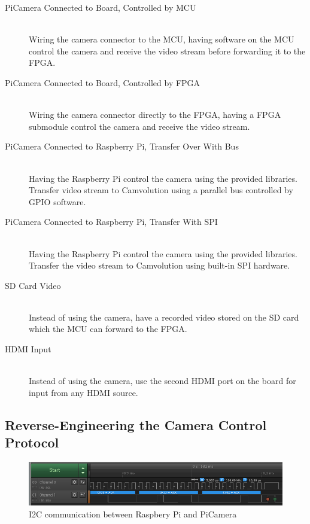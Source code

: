 \begin{description}
    \item[PiCamera Connected to Board, Controlled by MCU]
        \hfill\\
        Wiring the camera connector to the MCU, having software on the MCU control the camera and receive the video stream before forwarding it to the FPGA.
    \item[PiCamera Connected to Board, Controlled by FPGA]
        \hfill\\
        Wiring the camera connector directly to the FPGA, having a FPGA submodule control the camera and receive the video stream.
    \item[PiCamera Connected to Raspberry Pi, Transfer Over With Bus]
        \hfill\\
        Having the Raspberry Pi control the camera using the provided libraries.
        Transfer video stream to Camvolution using a parallel bus controlled by GPIO software.
    \item[PiCamera Connected to Raspberry Pi, Transfer With SPI]
        \hfill\\
        Having the Raspberry Pi control the camera using the provided libraries.
        Transfer the video stream to Camvolution using built-in SPI hardware.
    \item[SD Card Video]
        \hfill\\
        Instead of using the camera, have a recorded video stored on the SD card which the MCU can forward to the FPGA.
    \item[HDMI Input]
        \hfill\\
        Instead of using the camera, use the second HDMI port on the board for input from any HDMI source.
\end{description}

\subsection{Reverse-Engineering the Camera Control Protocol}
\begin{figure}
    \centering
    \includegraphics[width=\linewidth]{img/logic/pi_cam_i2c}
    \caption{I2C communication between Raspbery Pi and PiCamera}
    \label{fig:PiCamI2C}
\end{figure}

